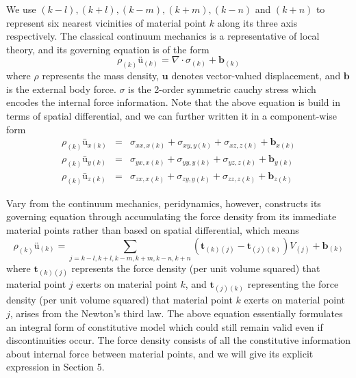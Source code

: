 \documentclass[a4paper,11pt,CJK]{paper}
\newcommand{\tkj}{\textbf{t}_{(k)(j)}}
\newcommand{\tjk}{\textbf{t}_{(j)(k)}}
\begin{document}
We use $(k-l),(k+l),(k-m),(k+m),(k-n)$ and $(k+n)$ to represent six nearest vicinities of material point $k$ along its three axis respectively.
The classical continuum mechanics is a representative of local theory, and its governing equation is of the form
\begin{equation}
\rho_{(k)}\textbf{\"u}_{(k)} = \nabla\cdot\sigma_{(k)} + \textbf{b}_{(k)}
\end{equation}
where $\rho$ represents the mass density, $\textbf{u}$ denotes vector-valued displacement, and $\textbf{b}$ is the external body force.
$\sigma$ is the 2-order symmetric cauchy stress which encodes the internal force information. Note that the above equation is build in terms of spatial differential,
and we can further written it in a component-wise form
\begin{eqnarray}
  \rho_{(k)}\textbf{\"u}_{x(k)} &=& \sigma_{xx,x(k)} + \sigma_{xy,y(k)} + \sigma_{xz,z(k)} + \textbf{b}_{x(k)} \\
  \rho_{(k)}\textbf{\"u}_{y(k)} &=& \sigma_{yx,x(k)} + \sigma_{yy,y(k)} + \sigma_{yz,z(k)} + \textbf{b}_{y(k)} \\
  \rho_{(k)}\textbf{\"u}_{z(k)} &=& \sigma_{zx,x(k)} + \sigma_{zy,y(k)} + \sigma_{zz,z(k)} + \textbf{b}_{z(k)}
\end{eqnarray}

Vary from the continuum mechanics, peridynamics, however, constructs its governing equation through accumulating the force density from its immediate material points
rather than based on spatial differential, which means
\begin{equation}
\rho_{(k)}\textbf{\"u}_{(k)} = \sum_{j=k-l,k+l,k-m,k+m,k-n,k+n}(\tkj-\tjk)V_{(j)} + \textbf{b}_{(k)}
\end{equation}
where $\tkj$ represents the force density (per unit volume squared) that material point $j$ exerts on material point $k$,
and $\tjk$ representing the force density (per unit volume squared) that material point $k$ exerts on material point $j$, arises from the Newton's third law.
The above equation essentially formulates an integral form of constitutive model which could still remain valid
even if discontinuities occur.
The force density consists of all the constitutive information about internal force between material points,
and we will give its explicit expression in Section 5.
\end{document}

